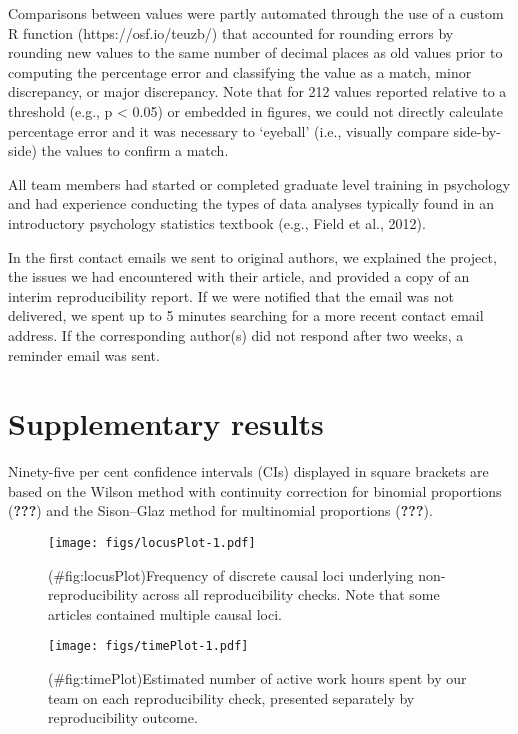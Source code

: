 \begin{appendix}
Comparisons between values were partly automated through the use of a
custom R function (https://osf.io/teuzb/) that accounted for rounding
errors by rounding new values to the same number of decimal places as
old values prior to computing the percentage error and classifying the
value as a match, minor discrepancy, or major discrepancy. Note that for
212 values reported relative to a threshold (e.g., p \textless{} 0.05)
or embedded in figures, we could not directly calculate percentage error
and it was necessary to `eyeball' (i.e., visually compare side-by-side)
the values to confirm a match.

All team members had started or completed graduate level training in
psychology and had experience conducting the types of data analyses
typically found in an introductory psychology statistics textbook (e.g.,
Field et al., 2012).

In the first contact emails we sent to original authors, we explained
the project, the issues we had encountered with their article, and
provided a copy of an interim reproducibility report. If we were
notified that the email was not delivered, we spent up to 5 minutes
searching for a more recent contact email address. If the corresponding
author(s) did not respond after two weeks, a reminder email was sent.

\hypertarget{sup_results}{%
\section{Supplementary results}\label{sup_results}}

Ninety-five per cent confidence intervals (CIs) displayed in square
brackets are based on the Wilson method with continuity correction for
binomial proportions ({\textbf{???}}) and the Sison--Glaz method for
multinomial proportions ({\textbf{???}}).

\begin{figure}
\centering
\texttt{[image: figs/locusPlot-1.pdf]}
\caption{(\#fig:locusPlot)Frequency of discrete causal loci underlying
non-reproducibility across all reproducibility checks. Note that some
articles contained multiple causal loci.}
\end{figure}

\begin{figure}
\centering
\texttt{[image: figs/timePlot-1.pdf]}
\caption{(\#fig:timePlot)Estimated number of active work hours spent by
our team on each reproducibility check, presented separately by
reproducibility outcome.}
\end{figure}


\end{appendix}
